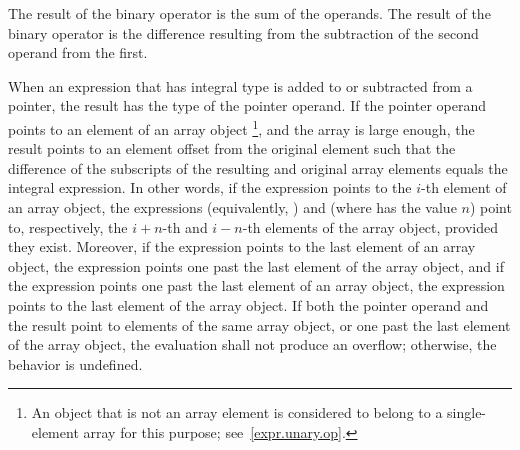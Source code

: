 \pnum
The result of the binary \tcode{+} operator is the sum of the operands.
The result of the binary \tcode{-} operator is the difference resulting
from the subtraction of the second operand from the first.

\pnum
{}%
When an expression that has integral type is added to or subtracted from
a pointer, the result has the type of the pointer operand. If the
pointer operand points to an element of an array object%
\footnote{An object that is not an array element is considered to belong to a
single-element array for this purpose; see~\ref{expr.unary.op}.}, and the array
is large enough, the result points to an element offset from the
original element such that the difference of the subscripts of the
resulting and original array elements equals the integral expression. In
other words, if the expression  points to the $i$-th element of
an array object, the expressions  (equivalently,
) and  (where  has the value $n$)
point to, respectively, the $i+n$-th and $i-n$-th elements of the array
object, provided they exist. Moreover, if the expression 
points to the last element of an array object, the expression
 points one past the last element of the array object, and
if the expression  points one past the last element of an array
object, the expression  points to the last element of the
array object. If both the pointer operand and the result point to
elements of the same array object, or one past the last element of the
array object, the evaluation shall not produce an overflow; otherwise,
the behavior is undefined.

